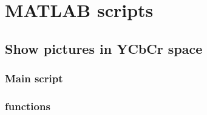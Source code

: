 \documentclass[Bachelorarbeit.tex]{subfiles}
\begin{document}
\chapter{MATLAB scripts}

\section{Show pictures in YCbCr space}
\subsection{Main script}


\subsection{functions}

\end{document}
